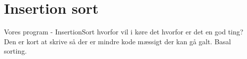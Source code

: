 \documentclass[class=report, crop=false]{standalone}
\begin{document}
    \section{Insertion sort}
    Vores program -\> InsertionSort hvorfor vil i køre det hvorfor er det en god ting? Den er kort at skrive så der er mindre kode mæssigt der kan gå galt. Basal sorting.
    \begin{tcolorbox}
        \lstset{style=codestyle}
        C}, lastline=22, caption=C\# Profiler]{Kode/Profiler.cs}
    \end{tcolorbox}
    \begin{tcolorbox}
        \lstset{style=codestyle}
        
    \end{tcolorbox}
\end{document}
